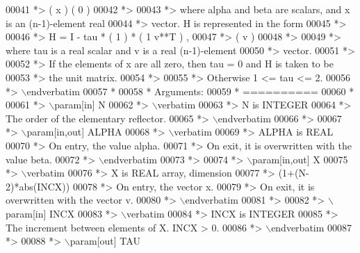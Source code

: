 \begin{DoxyCode}
00041 \textcolor{comment}{*>           (   x   )   (   0  )}
00042 \textcolor{comment}{*>}
00043 \textcolor{comment}{*> where alpha and beta are scalars, and x is an (n-1)-element real}
00044 \textcolor{comment}{*> vector. H is represented in the form}
00045 \textcolor{comment}{*>}
00046 \textcolor{comment}{*>       H = I - tau * ( 1 ) * ( 1 v**T ) ,}
00047 \textcolor{comment}{*>                     ( v )}
00048 \textcolor{comment}{*>}
00049 \textcolor{comment}{*> where tau is a real scalar and v is a real (n-1)-element}
00050 \textcolor{comment}{*> vector.}
00051 \textcolor{comment}{*>}
00052 \textcolor{comment}{*> If the elements of x are all zero, then tau = 0 and H is taken to be}
00053 \textcolor{comment}{*> the unit matrix.}
00054 \textcolor{comment}{*>}
00055 \textcolor{comment}{*> Otherwise  1 <= tau <= 2.}
00056 \textcolor{comment}{*> \(\backslash\)endverbatim}
00057 \textcolor{comment}{*}
00058 \textcolor{comment}{*  Arguments:}
00059 \textcolor{comment}{*  ==========}
00060 \textcolor{comment}{*}
00061 \textcolor{comment}{*> \(\backslash\)param[in] N}
00062 \textcolor{comment}{*> \(\backslash\)verbatim}
00063 \textcolor{comment}{*>          N is INTEGER}
00064 \textcolor{comment}{*>          The order of the elementary reflector.}
00065 \textcolor{comment}{*> \(\backslash\)endverbatim}
00066 \textcolor{comment}{*>}
00067 \textcolor{comment}{*> \(\backslash\)param[in,out] ALPHA}
00068 \textcolor{comment}{*> \(\backslash\)verbatim}
00069 \textcolor{comment}{*>          ALPHA is REAL}
00070 \textcolor{comment}{*>          On entry, the value alpha.}
00071 \textcolor{comment}{*>          On exit, it is overwritten with the value beta.}
00072 \textcolor{comment}{*> \(\backslash\)endverbatim}
00073 \textcolor{comment}{*>}
00074 \textcolor{comment}{*> \(\backslash\)param[in,out] X}
00075 \textcolor{comment}{*> \(\backslash\)verbatim}
00076 \textcolor{comment}{*>          X is REAL array, dimension}
00077 \textcolor{comment}{*>                         (1+(N-2)*abs(INCX))}
00078 \textcolor{comment}{*>          On entry, the vector x.}
00079 \textcolor{comment}{*>          On exit, it is overwritten with the vector v.}
00080 \textcolor{comment}{*> \(\backslash\)endverbatim}
00081 \textcolor{comment}{*>}
00082 \textcolor{comment}{*> \(\backslash\)param[in] INCX}
00083 \textcolor{comment}{*> \(\backslash\)verbatim}
00084 \textcolor{comment}{*>          INCX is INTEGER}
00085 \textcolor{comment}{*>          The increment between elements of X. INCX > 0.}
00086 \textcolor{comment}{*> \(\backslash\)endverbatim}
00087 \textcolor{comment}{*>}
00088 \textcolor{comment}{*> \(\backslash\)param[out] TAU}

\end{DoxyCode}

